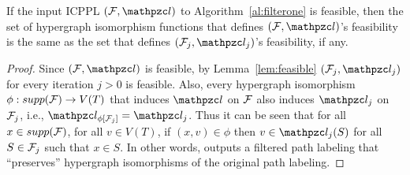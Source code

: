 \begin{lemma}
  \label{lem:noexit1}
  If the input ICPPL $(\cF, \cl)$ to Algorithm~\ref{al:filterone} is
  feasible, then the set of hypergraph isomorphism functions that
  defines $(\cF, \cl)$'s feasibility is the same as the set that
  defines $(\cF_j, \cl_j)$'s feasibility, if any.%
\end{lemma}
\begin{proof}\thesisspacing
  Since $(\cF,\cl)$ is feasible, by Lemma~\ref{lem:feasible}
  $(\cF_j,\cl_j)$ for every iteration $j > 0$ is
  feasible.  %
  Also, every hypergraph isomorphism $\phi: supp({\cal F}) \rightarrow
  V(T)$ that induces $\cl$ on ${\cal F}$ also induces $\cl_{j}$ on
  ${\cal F}_{j}$, i.e., $\cl_{\phi[\cF_j]} = \cl_j$. Thus it can be seen
  that for all $x \in supp({\cal F})$, for all $v \in V(T)$, if $(x,v) \in
  \phi$ then $v \in \cl_{j}(S)$ for all $S \in {\cal F}_{j}$ such that $x
  \in S$.
  In other words, \filteri outputs a filtered path labeling that
  ``preserves''
  hypergraph isomorphisms of the original path labeling.

\end{proof}
